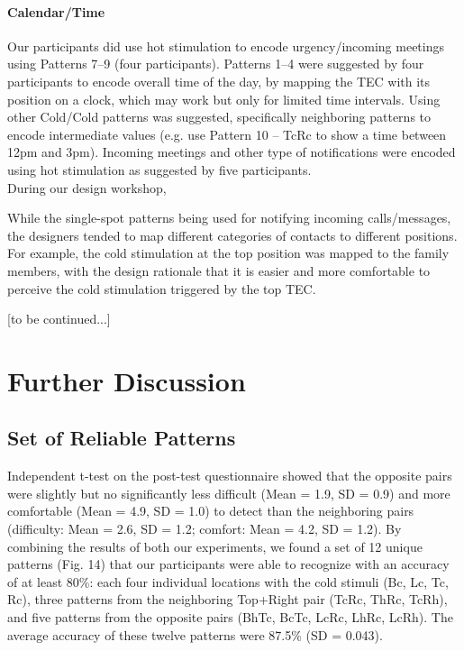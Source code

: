 \documentclass[preprint,12pt]{elsarticle}
\begin{document}
\paragraph{Calendar/Time}
Our participants did use hot stimulation to encode urgency/incoming meetings using Patterns 7--9 (four participants).
Patterns 1--4 were suggested by four participants to encode overall time of the day, by mapping the TEC with its position on a clock, which may work but only for limited time intervals. Using other Cold/Cold patterns was suggested, specifically neighboring patterns to encode intermediate values (e.g. use Pattern 10 -- TcRc to show a time between 12pm and 3pm).
Incoming meetings and other type of notifications were encoded using hot stimulation as suggested by five participants.
\\

During our design workshop,

While the single-spot patterns being used for notifying incoming calls/messages, the designers tended to map different categories of contacts to different positions. For example, the cold stimulation at the top position was mapped to the family members, with the design rationale that it is easier and more comfortable to perceive the cold stimulation triggered by the top TEC.

[to be continued...]

\section{Further Discussion}
\subsection{Set of Reliable Patterns}
Independent t-test on the post-test questionnaire showed that the opposite pairs were slightly but no significantly less difficult (Mean = 1.9, SD = 0.9) and more comfortable (Mean = 4.9, SD = 1.0) to detect than the neighboring pairs (difficulty: Mean = 2.6, SD = 1.2; comfort: Mean = 4.2, SD = 1.2). By combining the results of both our experiments, we found a set of 12 unique patterns (Fig. 14) that our participants were able to recognize with an accuracy of at least 80\%: each four individual locations with the cold stimuli (Bc, Lc, Tc, Rc), three patterns from the neighboring Top+Right pair (TcRc, ThRc, TcRh), and five patterns from the opposite pairs (BhTc, BcTc, LcRc, LhRc, LcRh). The average accuracy of these twelve patterns were 87.5\% (SD = 0.043).
\end{document}
